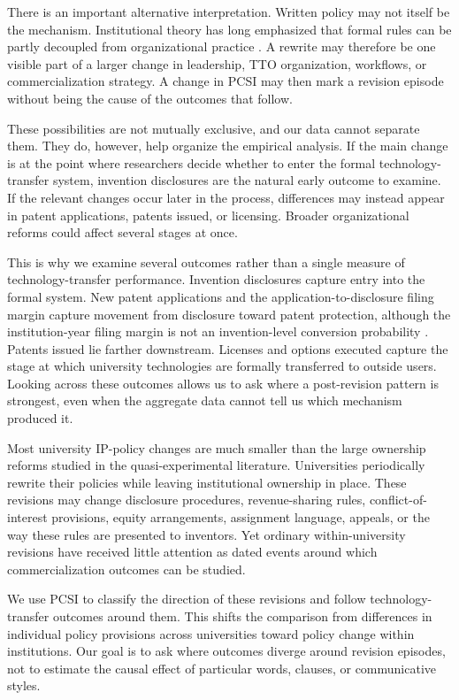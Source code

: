 There is an important alternative interpretation. Written policy may not itself be the mechanism. Institutional theory has long emphasized that formal rules can be partly decoupled from organizational practice \citep{MeyerRowan1977}. A rewrite may therefore be one visible part of a larger change in leadership, TTO organization, workflows, or commercialization strategy. A change in PCSI may then mark a revision episode without being the cause of the outcomes that follow.

These possibilities are not mutually exclusive, and our data cannot separate them. They do, however, help organize the empirical analysis. If the main change is at the point where researchers decide whether to enter the formal technology-transfer system, invention disclosures are the natural early outcome to examine. If the relevant changes occur later in the process, differences may instead appear in patent applications, patents issued, or licensing. Broader organizational reforms could affect several stages at once.

This is why we examine several outcomes rather than a single measure of technology-transfer performance. Invention disclosures capture entry into the formal system. New patent applications and the application-to-disclosure filing margin capture movement from disclosure toward patent protection, although the institution-year filing margin is not an invention-level conversion probability \citep{ChoudhryPonzio2020,Hall2021}. Patents issued lie farther downstream. Licenses and options executed capture the stage at which university technologies are formally transferred to outside users. Looking across these outcomes allows us to ask where a post-revision pattern is strongest, even when the aggregate data cannot tell us which mechanism produced it.

Most university IP-policy changes are much smaller than the large ownership reforms studied in the quasi-experimental literature. Universities periodically rewrite their policies while leaving institutional ownership in place. These revisions may change disclosure procedures, revenue-sharing rules, conflict-of-interest provisions, equity arrangements, assignment language, appeals, or the way these rules are presented to inventors. Yet ordinary within-university revisions have received little attention as dated events around which commercialization outcomes can be studied.

We use PCSI to classify the direction of these revisions and follow technology-transfer outcomes around them. This shifts the comparison from differences in individual policy provisions across universities toward policy change within institutions. Our goal is to ask where outcomes diverge around revision episodes, not to estimate the causal effect of particular words, clauses, or communicative styles.

